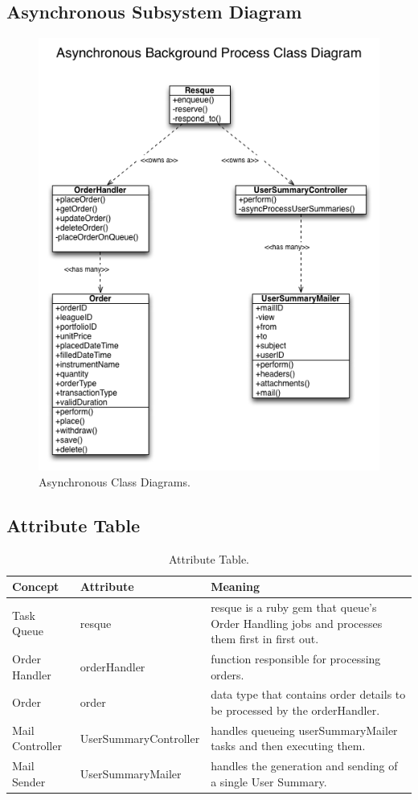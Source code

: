 \subsection{Asynchronous Subsystem Diagram}
\begin{figure}[b]
\centering
\includegraphics[width=5in]{./Diagrams/ClassDiagrams/cd.png}
\caption{ Asynchronous Class Diagrams.}
\end{figure}

\subsection{Attribute Table}
\begin{table}
\begin{tabular}{|p{1.5in}|p{1.5in}|p{3in}|}
\hline
Concept & Attribute & Meaning\\
\hline
Task Queue & resque & resque is a ruby gem that queue's Order Handling jobs and processes them first in first out.\\
\hline
Order Handler & orderHandler & function responsible for processing orders.\\
\hline
Order & order & data type that contains order details to be processed by the orderHandler.\\
\hline
Mail Controller & UserSummaryController & handles queueing userSummaryMailer tasks and then executing them.\\
\hline
Mail Sender & UserSummaryMailer & handles the generation and sending of a single User Summary.\\
\hline
\end{tabular}
\caption{ Attribute Table.}
\end{table}
